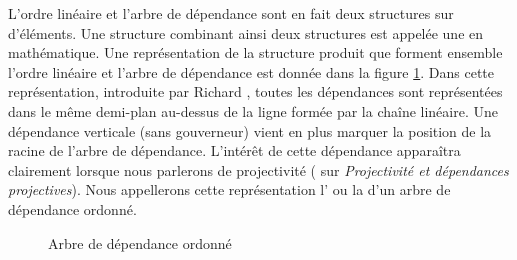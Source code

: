 L’ordre linéaire et l’arbre de dépendance sont en fait deux structures sur  d’éléments.  Une structure combinant ainsi deux structures est appelée une  en mathématique.
Une représentation de la structure produit que forment ensemble l’ordre linéaire et l’arbre de dépendance est donnée dans la figure \ref{fig:noel-Hudson}. Dans cette représentation, introduite par Richard \citet{hudson1984word}, toutes les dépendances sont représentées dans le même demi-plan au-dessus de la ligne formée par la chaîne linéaire. Une dépendance verticale (sans gouverneur) vient en plus marquer la position de la racine de l'arbre de dépendance. L’intérêt de cette dépendance apparaîtra clairement lorsque nous parlerons de projectivité ( sur \textit{Projectivité et dépendances projectives}). Nous appellerons cette représentation l' ou la   d'un arbre de dépendance ordonné.

\begin{figure}
\caption{Arbre de dépendance ordonné\label{fig:noel-Hudson}}
\end{figure}




